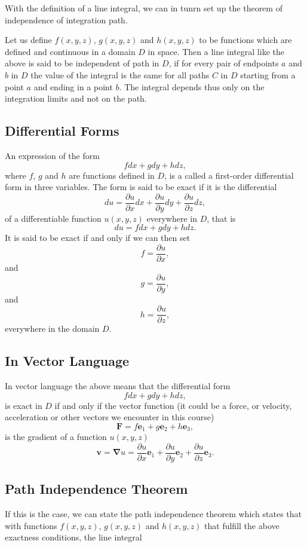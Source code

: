 \documentclass[%
oneside,                 %
final,                   %
10pt]{article}
\begin{document}
With the definition of a line integral, we can in tunrn set up the
theorem of independence of integration path.

Let us define
$f(x,y,z)$, $g(x,y,z)$ and $h(x,y,z)$ to be functions which are
defined and continuous in a domain $D$ in space. Then a line integral
like the above is said to be independent of path in $D$, if for every
pair of endpoints $a$ and $b$ in $D$ the value of the integral is the
same for all paths $C$ in $D$ starting from a point $a$ and ending in
a point $b$. The integral depends thus only on the integration limits
and not on the path.

\subsection{Differential Forms}

An expression of the form
\[
fdx+gdy+hdz,
\]
where $f$, $g$ and $h$ are functions defined in $D$, is a called a first-order differential form
in three variables.
The form is said to be exact if it is the differential
\[
du= \frac{\partial u}{\partial x}dx+\frac{\partial u}{\partial y}dy+\frac{\partial u}{\partial z}dz,
\]
of a differentiable function $u(x,y,z)$ everywhere in $D$, that is
\[
du=fdx+gdy+hdz.
\]
It is said to be exact if and only if we can then set
\[
f=\frac{\partial u}{\partial x},
\]
and
\[
g=\frac{\partial u}{\partial y},
\]
and
\[
h=\frac{\partial u}{\partial z},
\]
everywhere in the domain $D$.

\subsection{In Vector Language}

In vector language the above means that the differential form 
\[
fdx+gdy+hdz,
\]
is exact in $D$ if and only if the vector function (it could be a force, or velocity, acceleration or other vectors we encounter in this course)
\[
\bm{F}=f\bm{e}_1+g\bm{e}_2+h\bm{e}_3,
\]
is the gradient of a function $u(x,y,z)$
\[
\bm{v}=\bm{\nabla}u=\frac{\partial u}{\partial x}\bm{e}_1+\frac{\partial u}{\partial y}\bm{e}_2+\frac{\partial u}{\partial z}\bm{e}_3.
\]

\subsection{Path Independence Theorem}

If this is the case, we can state the path independence theorem which
states that with functions $f(x,y,z)$, $g(x,y,z)$ and $h(x,y,z)$ that fulfill the above
exactness conditions,  the line integral
\end{document}
